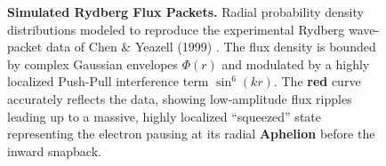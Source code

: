 \documentclass[11pt, a4paper]{article}
\begin{document}
\begin{figure}[!ht]
  \caption{\textbf{Simulated Rydberg Flux Packets.} Radial probability density distributions modeled to reproduce the experimental Rydberg wave-packet data of Chen \& Yeazell (1999) \cite{chen1999}. The flux density is bounded by complex Gaussian envelopes $\Phi(r)$ and modulated by a highly localized Push-Pull interference term $\sin^6(kr)$. The \textbf{red} curve accurately reflects the data, showing low-amplitude flux ripples leading up to a massive, highly localized ``squeezed'' state representing the electron pausing at its radial \textbf{Aphelion} before the inward snapback.}
  \vspace{-1.5em}
  \label{fig:rydberg_flux_packets}
\end{figure}

\clearpage
\end{document}
